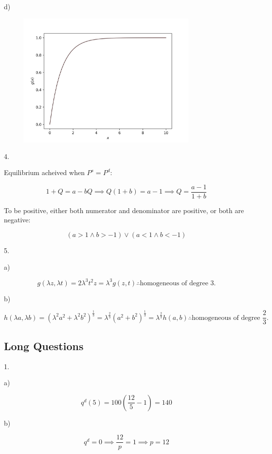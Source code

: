 \documentclass{article}
\begin{document}
d)

\begin{figure}[H]
  \centering
  \includegraphics[width=0.8\textwidth]{figures/4_Functions/QQ3d.png}
\end{figure}

4.

Equilibrium acheived when $P^s = P^d$:

$$
  1+Q = a-bQ \implies Q(1+b) = a-1 \implies Q = \frac{a-1}{1+b}
$$

To be positive, either both numerator and denominator are positive, or both are negative:

$$
  (a>1 \land b>-1) \lor (a<1 \land b<-1)
$$


5.

a)

$$
  g(\lambda z, \lambda t) = 2\lambda^3t^2z = \lambda^3g(z, t) \therefore \text{homogeneous of degree 3.}
$$

b)

$$
  h(\lambda a, \lambda b) = \left( \lambda^2a^2+\lambda^2b^2 \right)^{\frac{1}{3}} = \lambda^{\frac{2}{3}}\left( a^2+b^2 \right)^{\frac{1}{3}} = \lambda^{\frac{2}{3}}h(a, b) \therefore \text{homogeneous of degree $\frac{2}{3}$.}
$$

\clearpage

\subsection{Long Questions}
\noindent

1.

a)

$$
  q^d(5) = 100\left( \frac{12}{5}-1 \right) = 140
$$

b)

$$
  q^d = 0 \implies \frac{12}{p} = 1 \implies p = 12
$$
\end{document}
